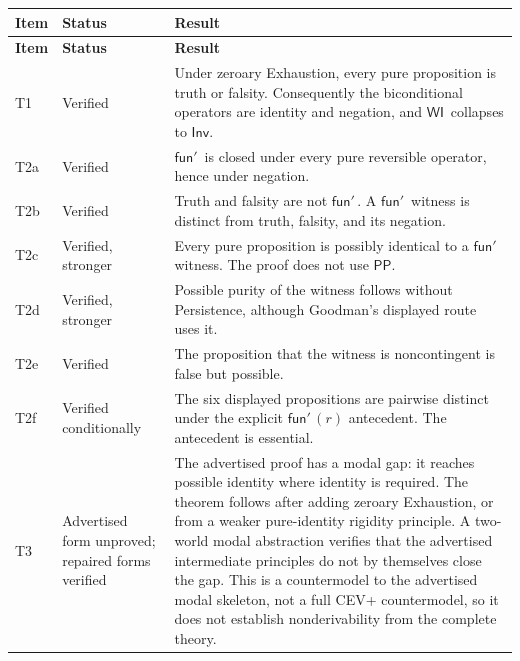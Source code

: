 \documentclass[12pt,leqno]{article}
\theoremstyle{plain}
\theoremstyle{definition}
\newcommand{\funp}{\ensuremath{\mathsf{fun}'\,}}
\newcommand{\PP}{\ensuremath{\mathsf{PP}}}
\newcommand{\WI}{\ensuremath{\mathsf{WI}}}
\newcommand{\Inv}{\ensuremath{\mathsf{Inv}}}
\begin{document}
\renewcommand{\arraystretch}{1.12}
\setlength{\tabcolsep}{4pt}
\begin{longtable}{>{\raggedright\arraybackslash}p{0.55in}
                  >{\raggedright\arraybackslash}p{1.18in}
                  >{\raggedright\arraybackslash}p{4.35in}}
\toprule
\textbf{Item} & \textbf{Status} & \textbf{Result}\\
\midrule
\endfirsthead
\toprule
\textbf{Item} & \textbf{Status} & \textbf{Result}\\
\midrule
\endhead
T1 & Verified &
Under zeroary Exhaustion, every pure proposition is truth or falsity.
Consequently the biconditional operators are identity and negation, and
\WI\ collapses to \Inv.\\

T2a & Verified &
\(\funp\) is closed under every pure reversible operator, hence under
negation.\\

T2b & Verified &
Truth and falsity are not \(\funp\).  A \(\funp\) witness is distinct from
truth, falsity, and its negation.\\

T2c & Verified, stronger &
Every pure proposition is possibly identical to a \(\funp\) witness.  The
proof does not use \PP.\\

T2d & Verified, stronger &
Possible purity of the witness follows without Persistence, although
Goodman's displayed route uses it.\\

T2e & Verified &
The proposition that the witness is noncontingent is false but possible.\\

T2f & Verified conditionally &
The six displayed propositions are pairwise distinct under the explicit
\(\funp(r)\) antecedent.  The antecedent is essential.\\

T3 & Advertised form unproved; repaired forms verified &
The advertised proof has a modal gap: it reaches possible identity where
identity is required.  The theorem follows after adding zeroary Exhaustion,
or from a weaker pure-identity rigidity principle.  A two-world modal
abstraction verifies that the advertised intermediate principles do not by
themselves close the gap.  This is a countermodel to the advertised modal
skeleton, not a full CEV+ countermodel, so it does not establish
nonderivability from the complete theory.\\


\end{longtable}
\end{document}
